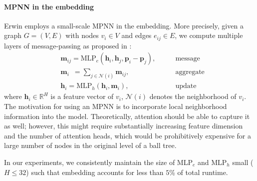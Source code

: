 \paragraph{MPNN in the embedding}
Erwin employs a small-scale MPNN in the embedding. More precisely, given a graph $G = (V, E)$ with nodes $v_i \in V$ and edges
$e_{ij} \in E$, we compute multiple layers of message-passing as proposed in \cite{gilmer2017neuralmessagepassingquantum}:
\begin{align}
\label{eq:mpnnlayer}
    &\mathbf{m}_{ij} = \text{MLP}_e(\mathbf{h}_i, \mathbf{h}_j, \mathbf{p}_i - \mathbf{p}_j), \nonumber \qquad &\mathrm{message} \\
    &\mathbf{m}_i \,\,\,= \sum_{j\in \mathcal{N}(i)} \mathbf{m}_{ij}, \qquad &\mathrm{aggregate} \\
    &\mathbf{h}_i = \text{MLP}_h(\mathbf{h}_i, \mathbf{m}_i), \nonumber \qquad &\mathrm{update}
\end{align}
where $\mathbf{h}_i \in \mathbb{R}^H$ is a feature vector of $v_i$, $\mathcal{N}(i)$ denotes the neighborhood of $v_i$.
The motivation for using an MPNN is to incorporate local neighborhood information into the model. Theoretically, attention should be able to capture it as well; however, this might require substantially increasing feature dimension and the number of attention heads, which would be prohibitively expensive for a large number of nodes in the original level of a ball tree. 

In our experiments, we consistently maintain the size of MLP$_e$ and MLP$_h$ small ($H \leq 32$) such that embedding accounts for less than $5$\% of total runtime. 


